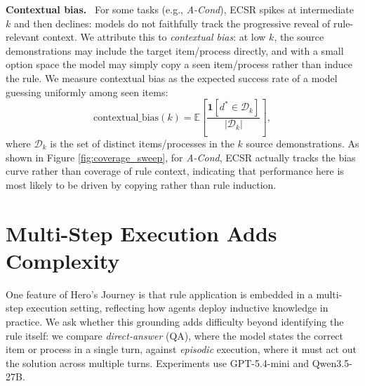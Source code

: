 \documentclass[11pt]{article}
\newcommand{\AS}{{\sc Hero's Journey}\xspace}
\begin{document}

\noindent\textbf{Contextual bias.}~
For some tasks (e.g., \textit{A-Cond}), ECSR spikes at intermediate $k$ and then declines: models do not faithfully track the progressive reveal of rule-relevant context.
We attribute this to \emph{contextual bias}: at low $k$, the source demonstrations may include the target item/process directly, and with a small option space the model may simply copy a seen item/process rather than induce the rule.
We measure contextual bias as the expected success rate of a model guessing uniformly among seen items:
\[
  \text{contextual\_bias}(k) = \mathbb{E}\!\left[
    \frac{\mathbf{1}[d^{*} \in \mathcal{D}_k]}{|\mathcal{D}_k|}
  \right],
\]
where $\mathcal{D}_k$ is the set of distinct items/processes in the $k$ source demonstrations.
As shown in Figure \ref{fig:coverage_sweep}, for \textit{A-Cond}, ECSR actually tracks the bias curve rather than coverage of rule context, indicating that performance here is most likely to be driven by copying rather than rule induction.



\section{Multi-Step Execution Adds Complexity}
\label{sec:other_factors}

One feature of \AS is that rule application is embedded in a multi-step execution setting, reflecting how agents deploy inductive knowledge in practice. We ask whether this grounding adds difficulty beyond identifying the rule itself: we compare \emph{direct-answer} (QA), where the model states the correct item or process in a single turn, against \emph{episodic} execution, where it must act out the solution across multiple turns. Experiments use GPT-5.4-mini and Qwen3.5-27B.

\end{document}

